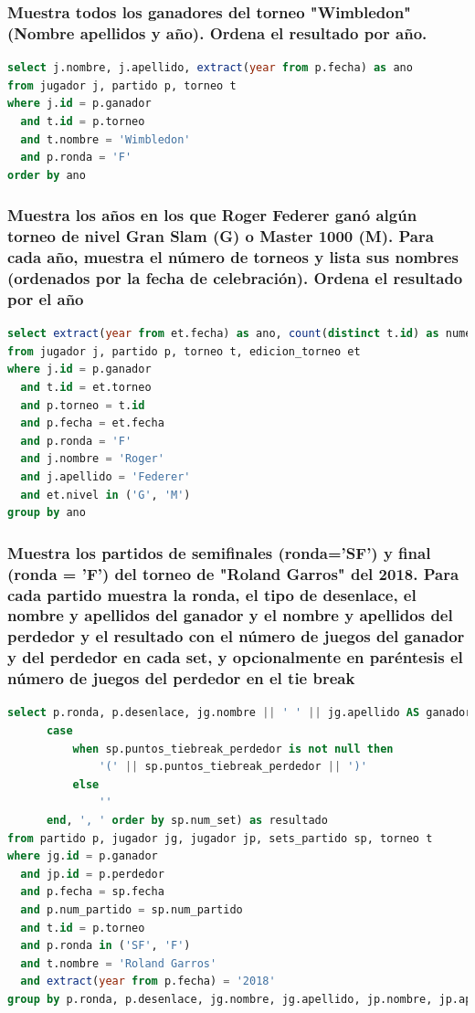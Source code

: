 \documentclass[10pt]{opticajnl}
\begin{document}
\subsubsection{Muestra todos los ganadores del torneo "Wimbledon" (Nombre apellidos y año). Ordena el resultado por año.}

\begin{lstlisting}[language=SQL]
select j.nombre, j.apellido, extract(year from p.fecha) as ano
from jugador j, partido p, torneo t
where j.id = p.ganador 
  and t.id = p.torneo 
  and t.nombre = 'Wimbledon' 
  and p.ronda = 'F'
order by ano
\end{lstlisting}


\subsubsection{Muestra los años en los que Roger Federer ganó algún torneo de nivel Gran Slam (G) o Master 1000 (M). Para cada año, muestra el número de torneos y lista sus nombres (ordenados por la fecha de celebración). Ordena el resultado por el año}

\begin{lstlisting}[language=SQL]
select extract(year from et.fecha) as ano, count(distinct t.id) as numero_torneos, string_agg(t.nombre, ', ' order by et.fecha) as torneos
from jugador j, partido p, torneo t, edicion_torneo et
where j.id = p.ganador
  and t.id = et.torneo
  and p.torneo = t.id
  and p.fecha = et.fecha
  and p.ronda = 'F'
  and j.nombre = 'Roger'
  and j.apellido = 'Federer'
  and et.nivel in ('G', 'M')
group by ano
\end{lstlisting}

\subsubsection{Muestra los partidos de semiﬁnales (ronda='SF') y ﬁnal (ronda = 'F') del torneo de "Roland Garros" del 2018. Para cada partido muestra la ronda, el tipo de desenlace, el nombre y apellidos del ganador y el nombre y apellidos del perdedor y el resultado con el número de juegos del ganador y del perdedor en cada set, y opcionalmente en paréntesis el número de juegos del perdedor en el tie break}

\begin{lstlisting}[language=SQL]
select p.ronda, p.desenlace, jg.nombre || ' ' || jg.apellido AS ganador, jp.nombre || ' ' || jp.apellido AS perdedor, STRING_AGG(sp.juegos_ganador || '-' || sp.juegos_perdedor ||
      case
          when sp.puntos_tiebreak_perdedor is not null then
              '(' || sp.puntos_tiebreak_perdedor || ')'
          else
              ''
      end, ', ' order by sp.num_set) as resultado
from partido p, jugador jg, jugador jp, sets_partido sp, torneo t
where jg.id = p.ganador
  and jp.id = p.perdedor
  and p.fecha = sp.fecha
  and p.num_partido = sp.num_partido
  and t.id = p.torneo
  and p.ronda in ('SF', 'F')
  and t.nombre = 'Roland Garros'
  and extract(year from p.fecha) = '2018'
group by p.ronda, p.desenlace, jg.nombre, jg.apellido, jp.nombre, jp.apellido, p.fecha
\end{lstlisting}
\end{document}
